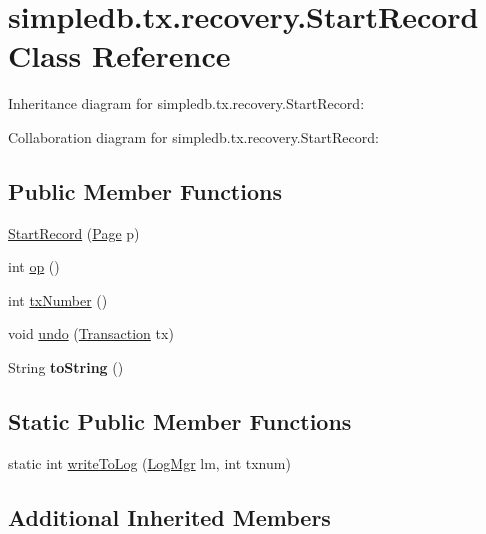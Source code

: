 \hypertarget{classsimpledb_1_1tx_1_1recovery_1_1StartRecord}{}\section{simpledb.\+tx.\+recovery.\+Start\+Record Class Reference}
\label{classsimpledb_1_1tx_1_1recovery_1_1StartRecord}


Inheritance diagram for simpledb.\+tx.\+recovery.\+Start\+Record\+:


Collaboration diagram for simpledb.\+tx.\+recovery.\+Start\+Record\+:
\subsection*{Public Member Functions}
\begin{DoxyCompactItemize}
\item 
\hyperlink{classsimpledb_1_1tx_1_1recovery_1_1StartRecord_ab1ed9daa86a924274c0d2bf0f569450d}{Start\+Record} (\hyperlink{classsimpledb_1_1file_1_1Page}{Page} p)
\item 
int \hyperlink{classsimpledb_1_1tx_1_1recovery_1_1StartRecord_a528df40fb41199ed19510524aa0a8044}{op} ()
\item 
int \hyperlink{classsimpledb_1_1tx_1_1recovery_1_1StartRecord_ae6680c3904f3a0734c2a8656ed58b706}{tx\+Number} ()
\item 
void \hyperlink{classsimpledb_1_1tx_1_1recovery_1_1StartRecord_af33d26ca2032ba63cc06f266e9c41efa}{undo} (\hyperlink{classsimpledb_1_1tx_1_1Transaction}{Transaction} tx)
\item 
\mbox{\label{classsimpledb_1_1tx_1_1recovery_1_1StartRecord_a34365b65e3d78af0ebb8bb329529b9b1}} 
String {\bfseries to\+String} ()
\end{DoxyCompactItemize}
\subsection*{Static Public Member Functions}
\begin{DoxyCompactItemize}
\item 
static int \hyperlink{classsimpledb_1_1tx_1_1recovery_1_1StartRecord_a11435145a96d9cc068a0c80cb3131d63}{write\+To\+Log} (\hyperlink{classsimpledb_1_1log_1_1LogMgr}{Log\+Mgr} lm, int txnum)
\end{DoxyCompactItemize}
\subsection*{Additional Inherited Members}


